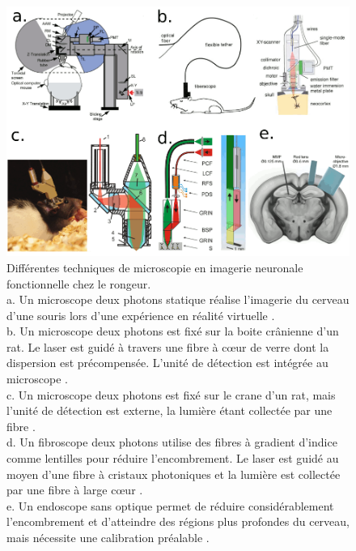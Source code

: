 \begin{figure}
\centering
\includegraphics[width=\textwidth]{./files/fiber_functional_imaging.svg.png}
\caption{Différentes techniques de microscopie en imagerie neuronale fonctionnelle chez le rongeur.\\
a. Un microscope deux photons statique réalise l'imagerie du cerveau d'une souris lors d'une expérience en réalité virtuelle \cite{dombeck_functional_2010}.\\
b. Un microscope deux photons est fixé sur la boite crânienne d'un rat. Le laser est guidé à travers une fibre à cœur de verre dont la dispersion est précompensée. L'unité de détection est intégrée au microscope \cite{helmchen_miniature_2001}.\\
c. Un microscope deux photons est fixé sur le crane d'un rat, mais l'unité de détection est externe, la lumière étant collectée par une fibre \cite{sawinski_visually_2009}. \\
d. Un fibroscope deux photons utilise des fibres à gradient d'indice comme lentilles pour réduire l'encombrement. Le laser est guidé au moyen d'une fibre à cristaux photoniques et la lumière est collectée par une fibre à large cœur \cite{engelbrecht_ultra-compact_2008}. \\
e. Un endoscope sans optique permet de réduire considérablement l'encombrement et d'atteindre des régions plus profondes du cerveau, mais nécessite une calibration préalable \cite{turtaev_high-fidelity_2018}.
}
\end{figure}



